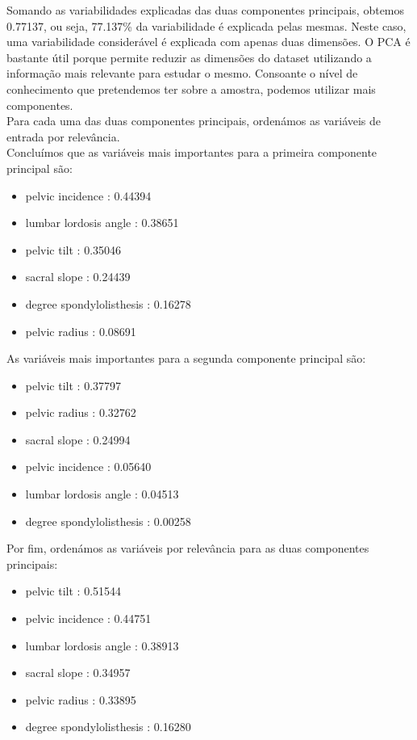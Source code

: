 \documentclass[a4paper,12pt]{article} %
\begin{document}
\begin{enumerate}
Somando as variabilidades explicadas das duas componentes principais, obtemos 0.77137, ou seja, 77.137\% da variabilidade é explicada pelas mesmas. Neste caso, uma variabilidade considerável é explicada com apenas duas dimensões.
O PCA é bastante útil porque permite reduzir as dimensões do dataset utilizando a informação mais relevante para estudar o mesmo. Consoante o nível de conhecimento que pretendemos ter sobre a amostra, podemos utilizar mais componentes.\\

Para cada uma das duas componentes principais, ordenámos as variáveis de entrada por relevância. \\

Concluímos que as variáveis mais importantes para a primeira componente principal são: 
\begin{itemize}
    \item pelvic incidence :  0.44394
    \item lumbar lordosis angle :  0.38651
    \item pelvic tilt :  0.35046
    \item sacral slope :  0.24439
    \item degree spondylolisthesis :  0.16278
    \item pelvic radius :  0.08691
\end{itemize}

As variáveis mais importantes para a segunda componente principal são: 
\begin{itemize}
    \item pelvic tilt :  0.37797
    \item pelvic radius :  0.32762
    \item sacral slope :  0.24994
    \item pelvic incidence :  0.05640
    \item lumbar lordosis angle :  0.04513
    \item degree spondylolisthesis :  0.00258
\end{itemize}

Por fim, ordenámos as variáveis por relevância para as duas componentes principais: 
\begin{itemize}    
    \item pelvic tilt :  0.51544
    \item pelvic incidence :  0.44751
    \item lumbar lordosis angle :  0.38913
    \item sacral slope :  0.34957
    \item pelvic radius :  0.33895
    \item degree spondylolisthesis :  0.16280 \\
\end{itemize} 


\end{enumerate}
\end{document}
